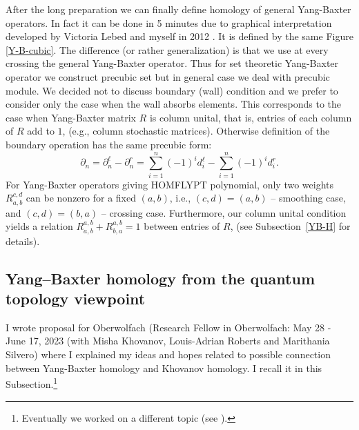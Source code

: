 \documentclass[12pt]{amsart}
\begin{document}
After the long preparation we can finally define homology of general Yang-Baxter operators.
In fact it can be done in 5 minutes due to graphical interpretation developed by Victoria Lebed and myself in 2012 \cite{Leb-1,Prz10}. It is defined by the same Figure \ref{Y-B-cubic}. The difference (or rather generalization) is that we use at every crossing the general Yang-Baxter operator. Thus for set theoretic Yang-Baxter operator we construct precubic set but in general case we deal with precubic module. We decided not to discuss boundary (wall) condition and we prefer to consider only the case when the wall absorbs elements. This corresponds to the case when Yang-Baxter matrix $R$ is column unital, that is, entries of each column of $R$ add to $1$, (e.g., column stochastic matrices). Otherwise definition of the boundary operation has the same precubic form:
\begin{equation*}
\partial_n= \partial_n^{\ell} -\partial_n^r =\sum_{i=1}^n(-1)^id_i^{\ell} - \sum_{i=1}^n(-1)^id_i^{r}.   
\end{equation*}
For Yang-Baxter operators giving HOMFLYPT polynomial, only two
weights $R_{a,b}^{c,d}$ can be nonzero for a fixed $(a,b)$, i.e., $(c,d)=(a,b)$ -- smoothing case, and $(c,d)=(b,a)$ -- crossing case. Furthermore, our column unital condition yields a
relation $R_{a,b}^{a,b}+R_{b,a}^{a,b}=1$ between entries of $R$, (see
Subsection~\ref{YB-H} for details).

\subsection{Yang–Baxter homology from the quantum topology viewpoint}
I wrote proposal for Oberwolfach (Research Fellow in Oberwolfach: May 28 - June 17, 2023 (with Misha Khovanov, Louis-Adrian Roberts and Marithania Silvero) where I explained my ideas and hopes related to possible connection between Yang-Baxter homology and  Khovanov homology. I recall it in this Subsection.\footnote{Eventually we worked on a different topic (see \cite{KPRS}).}
\end{document}
